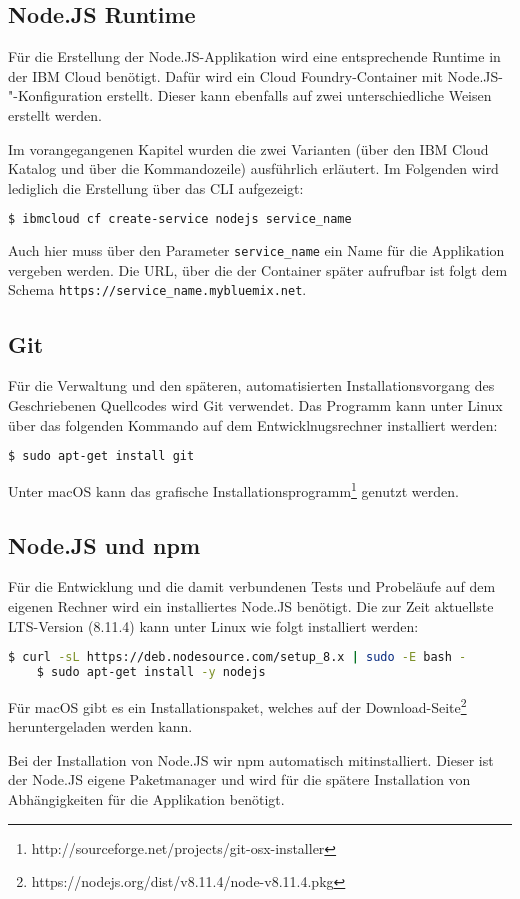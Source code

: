 \subsection{Node.JS Runtime}
\label{ssc:nodejs_runtime}
Für die Erstellung der Node.JS-Applikation wird eine entsprechende Runtime in der IBM Cloud benötigt. Dafür wird ein
Cloud Foundry-Container mit Node.JS-"-Konfiguration erstellt. Dieser kann ebenfalls auf zwei unterschiedliche Weisen erstellt
werden.

Im vorangegangenen Kapitel wurden die zwei Varianten (über den IBM Cloud Katalog und über die Kommandozeile) ausführlich
erläutert. Im Folgenden wird lediglich die Erstellung über das CLI aufgezeigt:

\begin{lstlisting}[language=bash, caption=Instanziierung der Node.JS Runtime, label=Instanziierung der Node.JS Runtime]
    $ ibmcloud cf create-service nodejs service_name
\end{lstlisting}

Auch hier muss über den Parameter \texttt{service\_name} ein Name für die Applikation vergeben werden. Die URL, über die
der Container später aufrufbar ist folgt dem Schema \texttt{https://service\_name.mybluemix.net}.

\subsection{Git}
Für die Verwaltung und den späteren, automatisierten Installationsvorgang des Geschriebenen Quellcodes wird Git verwendet.
Das Programm kann unter Linux über das folgenden Kommando auf dem Entwicklnugsrechner installiert werden:

\begin{lstlisting}[language=bash, caption=Installation von Git, label=Installation von Git]
    $ sudo apt-get install git
\end{lstlisting}

Unter macOS kann das grafische Installationsprogramm\footnote{http://sourceforge.net/projects/git-osx-installer} genutzt
werden.

\subsection{Node.JS und npm}
Für die Entwicklung und die damit verbundenen Tests und Probeläufe auf dem eigenen Rechner wird ein installiertes Node.JS
benötigt. Die zur Zeit aktuellste LTS-Version (8.11.4) kann unter Linux wie folgt installiert werden:

\begin{lstlisting}[language=bash, caption=Installation von Node.JS, label=Installation von Node.JS]
    $ curl -sL https://deb.nodesource.com/setup_8.x | sudo -E bash -
    $ sudo apt-get install -y nodejs
\end{lstlisting}

Für macOS gibt es ein Installationspaket, welches auf der Download-Seite\footnote{https://nodejs.org/dist/v8.11.4/node-v8.11.4.pkg}
heruntergeladen werden kann.

Bei der Installation von Node.JS wir npm automatisch mitinstalliert. Dieser ist der Node.JS eigene Paketmanager und wird
für die spätere Installation von Abhängigkeiten für die Applikation benötigt.